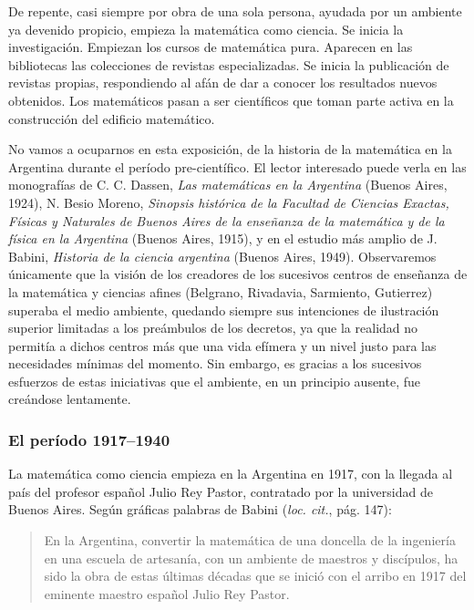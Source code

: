 De repente, casi siempre por obra de una sola persona, ayudada por un ambiente
ya devenido propicio, empieza la matemática como ciencia. Se inicia la
investigación. Empiezan los cursos de matemática pura. Aparecen en las
bibliotecas las colecciones de revistas especializadas. Se inicia la
publicación de revistas propias, respondiendo al afán de dar a conocer los
resultados nuevos obtenidos. Los matemáticos pasan a ser científicos que toman
parte activa en la construcción del edificio matemático. 

No vamos a ocuparnos en esta exposición, de la historia de la matemática en la
Argentina durante el período pre-científico. El lector interesado puede verla
en las monografías de C. C. Dassen, \emph{Las matemáticas en la Argentina}
(Buenos Aires, 1924), N. Besio Moreno, \emph{Sinopsis histórica de la Facultad
de Ciencias Exactas, Físicas y Naturales de Buenos Aires de la enseñanza de la
matemática y de la física en la Argentina} (Buenos Aires, 1915), y en el
estudio más amplio de J. Babini, \emph{Historia de la ciencia argentina}
(Buenos Aires, 1949). Observaremos únicamente que la visión de los creadores de
los sucesivos centros de enseñanza de la matemática y ciencias afines
(Belgrano, Rivadavia, Sarmiento, Gutierrez) superaba el medio ambiente,
quedando siempre sus intenciones de ilustración superior limitadas a los
preámbulos de los decretos, ya que la realidad no permitía a dichos centros más
que una vida efímera y un nivel justo para las necesidades mínimas del momento.
Sin embargo, es gracias a los sucesivos esfuerzos de estas iniciativas que el
ambiente, en un principio ausente, fue creándose lentamente. 

\subsubsection*{El período 1917--1940}

La matemática como ciencia empieza en la Argentina en 1917, con la llegada al
país del profesor español Julio Rey Pastor, contratado por la universidad de
Buenos Aires. Según gráficas palabras de Babini (\emph{loc. cit.}, pág. 147):

\begin{quote}
	En la Argentina, convertir la matemática de una doncella de la ingeniería
	en una escuela de artesanía, con un ambiente de maestros y discípulos, ha
	sido la obra de estas últimas décadas que se inició con el arribo en 1917
	del eminente maestro español Julio Rey Pastor.  
\end{quote}

